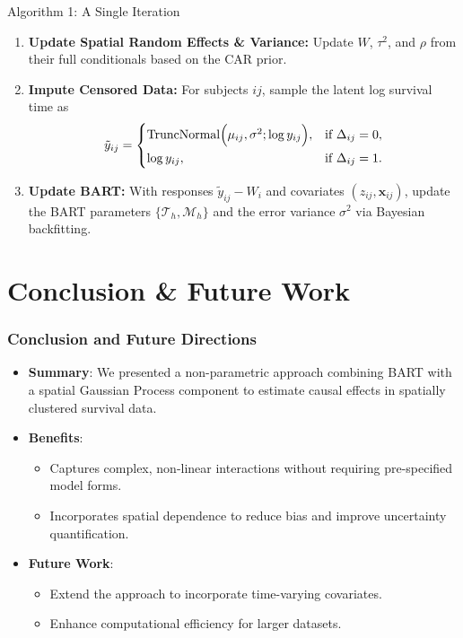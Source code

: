 \documentclass{beamer}
\begin{document}
\begin{frame}{Algorithm 1: A Single Iteration}
  \begin{enumerate}
    \item \textbf{Update Spatial Random Effects \& Variance:} Update \(W\), \(\tau^2\), and \(\rho\) from their full conditionals based on the CAR prior.
    
    \item \textbf{Impute Censored Data:} For subjects $ij$, sample the latent log survival time as
      \[
      \tilde{y}_{ij} =
      \begin{cases}
        \operatorname{TruncNormal}\Bigl(\mu_{ij},\sigma^2;\log y_{ij}\Bigr), & \text{if } \Delta_{ij}=0, \\[1ex]
        \log y_{ij}, & \text{if } \Delta_{ij}=1.
      \end{cases}
      \]
    \item \textbf{Update BART:} With responses \(\tilde{y}_{ij} - W_i\) and covariates \((z_{ij},\mathbf{x}_{ij})\), update the BART parameters \(\{\mathcal{T}_h,\mathcal{M}_h\}\) and the error variance \(\sigma^2\) via Bayesian backfitting.
    
  \end{enumerate}
\end{frame}
 



\section{Conclusion \& Future Work}

\begin{frame}
\frametitle{Conclusion and Future Directions}
\begin{itemize}
    \item \textbf{Summary}: We presented a non-parametric approach combining BART with a spatial Gaussian Process component to estimate causal effects in spatially clustered survival data.
    \item \textbf{Benefits}:
    \begin{itemize}
       \item Captures complex, non-linear interactions without requiring pre-specified model forms.
       \item Incorporates spatial dependence to reduce bias and improve uncertainty quantification.
    \end{itemize}
    \item \textbf{Future Work}: 
    \begin{itemize}
       \item Extend the approach to incorporate time-varying covariates.
       \item Enhance computational efficiency for larger datasets.
    \end{itemize}
\end{itemize}
\end{frame}
\end{document}
